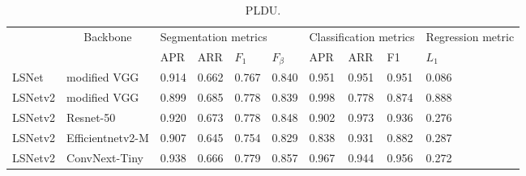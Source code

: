 \documentclass[journal]{IEEEtran}
\begin{document}
\begin{table}[]
  \begin{tabular}{l|l|llll|lll|l}
  \hline
          & \multicolumn{1}{c|}{\multirow{2}{*}{Backbone}} & \multicolumn{4}{l|}{Segmentation metrics} & \multicolumn{3}{l|}{Classification metrics} & Regression metric \\ \cline{3-10} 
          & \multicolumn{1}{c|}{}                          & APR      & ARR      & $F_1$       & $F_{\beta}$    & APR           & ARR          & F1           & $L_1$          \\ \hline
  LSNet   & modified VGG                                   & 0.914    & 0.662    & 0.767       & 0.840          & 0.951         & 0.951        & 0.951        & 0.086          \\
  LSNetv2 & modified VGG                                   & 0.899    & 0.685    & 0.778       & 0.839          & 0.998         & 0.778        & 0.874        & 0.888          \\
  LSNetv2 & Resnet-50                                      & 0.920    & 0.673    & 0.778       & 0.848          & 0.902         & 0.973        & 0.936        & 0.276          \\
  LSNetv2 & Efficientnetv2-M                               & 0.907    & 0.645    & 0.754       & 0.829          & 0.838         & 0.931        & 0.882        & 0.287          \\
  LSNetv2 & ConvNext-Tiny                                  & 0.938    & 0.666    & 0.779       & 0.857          & 0.967         & 0.944        & 0.956        & 0.272            
  \end{tabular}
  \caption{\label{pldu_table} PLDU.}
\end{table}
\end{document}
